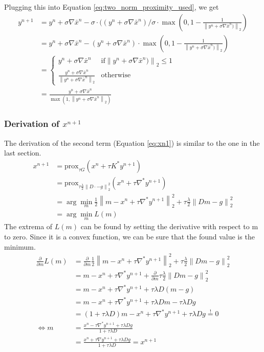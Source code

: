 \documentclass{paper}
\newcommand{\prox}{\text{prox}}
\newcommand{\twonorm}[1]{\left\lVert#1\right\rVert_2}
\begin{document}
Plugging this into Equation \eqref{eq:two_norm_proximity_used}, we get
\begin{align}
	y^{n+1} &= y^n + \sigma \nabla \bar{x}^n - 
			   \sigma \cdot ((y^n + \sigma \nabla \bar{x}^n) / \sigma \cdot
			   \max \left(0, 1 - \frac{1}{\twonorm{y^n + \sigma \nabla \bar{x}^n)}} \right) \\
			&= y^n + \sigma \nabla \bar{x}^n - 
			   (y^n + \sigma \nabla \bar{x}^n) \cdot
			   \max \left(0, 1 - \frac{1}{\twonorm{y^n + \sigma \nabla \bar{x}^n)}} \right) \\
			&= \begin{cases}
   				y^n + \sigma \nabla \bar{x}^n  			
   						& \text{if} \twonorm{y^n + \sigma \nabla \bar{x}^n)} \leq 1 \\
   				\frac{y^n + \sigma \nabla \bar{x}^n}
				    {\twonorm{y^n + \sigma \nabla \bar{x}^n}}      
				    		& \text{otherwise}
  			 \end{cases} \label{eq:cases_F_star} \\
			&= \frac{y^n + \sigma \nabla \bar{x}^n}
				    {\max \left(1, \twonorm{y^n + \sigma \nabla \bar{x}^n}\right)}
\end{align}

\subsubsection*{Derivation of $x^{n+1}$}
The derivation of the second term (Equation \eqref{eq:xn1}) is similar 
to the one in the last section. 
\begin{align}
x^{n+1} &= \prox_{\tau G}(x^n + \tau K^* y^{n+1}) \\
	    &= \prox_{\tau \frac{\lambda}{2}\twonorm{ D\cdot - g}^2}(x^n + \tau \nabla^* y^{n+1}) \\
	    &= \arg \min_m \frac{1}{2} \twonorm{m - x^n + \tau \nabla^* y^{n+1}}^2 + \tau \frac{\lambda}{2}\twonorm{ Dm - g}^2 \\
	    &= \arg \min_m L(m)
\end{align}
The extrema of $L(m)$ can be found by setting the derivative 
with respect to m to zero. Since it is a convex function, we can be sure that the 
found value is the minimum.
\begin{align}
\frac{\partial}{\partial m} L(m) &= \frac{\partial}{\partial m} \frac{1}{2} \twonorm{m - x^n + \tau \nabla^* y^{n+1}}^2 
+ \tau \frac{\lambda}{2}\twonorm{ Dm - g}^2 \\
&= m - x^n + \tau \nabla^* y^{n+1} +
\frac{\partial}{\partial m} \tau \frac{\lambda}{2}\twonorm{Dm - g}^2 \\
&= m - x^n + \tau \nabla^* y^{n+1} +
\tau \lambda D(m - g) \\
&= m - x^n + \tau \nabla^* y^{n+1} +
\tau \lambda Dm - \tau \lambda D g \\
&= (1 + \tau \lambda D)m - x^n + \tau \nabla^* y^{n+1} +
\tau \lambda D g \overset{!}{=} 0 \\
\Longleftrightarrow m &= \frac{x^n - \tau \nabla^* y^{n+1} + \tau \lambda D g}
{1 + \tau \lambda D} \\
&= \frac{x^n + \tau \nabla y^{n+1} + \tau \lambda D g}
{1 + \tau \lambda D} = x^{n+1}
\end{align}
\end{document}

